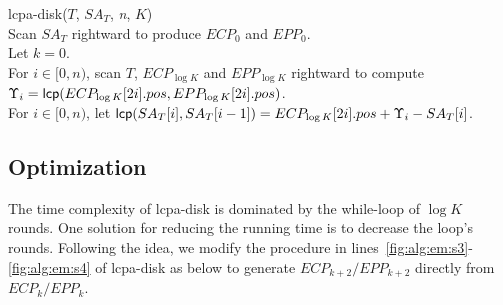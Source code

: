 \documentclass[10pt,journal,letterpaper,compsoc]{IEEEtran}
\begin{document}
\begin{CJK*}{GBK}{song}
\begin{algorithm}[hbtp!]
\caption{Compute $K$-Order $LCPA_T$ in Disk}
\label{fig:alg:em}
lcpa-disk($T$, $SA_T$, {\em n}, $K$){\\
\SetAlgoNoLine
Scan $SA_T$ rightward to produce $ECP_0$ and $EPP_0$. \\
Let $k = 0$. \\
\While{$k < \log K$}{
\Indentp{-1em}
Radix-sort $ECP_k$ and $EPP_k$ by $pos$ to produce $IECP_k$ and $IEPP_k$. \label{fig:alg:em:s1}\\
For $i\in [0,n)$ and $j\in [0,2n)$, scan $T$ rightward to iteratively compute the fingerprint of ${\sf pre}(T,i)$ and assign $FP[0,i]$ to $IECP_k[j].fp$ or $IEPP_k[j].fp$ if $IECP_k[j].pos = i$ or $IEPP_k[j].pos = i$, respectively. \\
Radix-sort $IECP_k$ and $IEPP_k$ by $idx$ to reproduce $ECP_k$ and $EPP_k$. \label{fig:alg:em:s2}\\
For $i \in [0,n)$, scan $ECP_k$ and $EPP_k$ rightward to compute and compare each pair of $(FP[ECP_k[2i].pos+1,ECP_k[2i+1].pos], FP[EPP_k[2i].pos+1,EPP_k[2i+1].pos])$ for generating $ECP_{k+1}$ and $EPP_{k+1}$. \label{fig:alg:em:s3}\\
Let $k = k + 1$. \label{fig:alg:em:s4}\\
}
For $i \in [0,n)$, scan $T$, $ECP_{\log K}$ and $EPP_{\log K}$ rightward to compute $\Upsilon_i = {\sf lcp}(ECP_{\log K}[2i].pos,EPP_{\log K}[2i].pos)$. \\
For $i \in [0,n)$, let ${\sf lcp}(SA_T[i],SA_T[i-1])=ECP_{\log K}[2i].pos+\Upsilon_i-SA_T[i]$.\\
}
\end{algorithm}

\subsection{Optimization}\label{subsec:optimization}
The time complexity of lcpa-disk is dominated by the while-loop of $\log K$ rounds. One solution for reducing the running time is to decrease the loop's rounds. Following the idea, we modify the procedure in lines~\ref{fig:alg:em:s3}-\ref{fig:alg:em:s4} of lcpa-disk as below to generate $ECP_{k+2}/EPP_{k+2}$ directly from $ECP_k/EPP_k$.


\end{CJK*}
\end{document}
